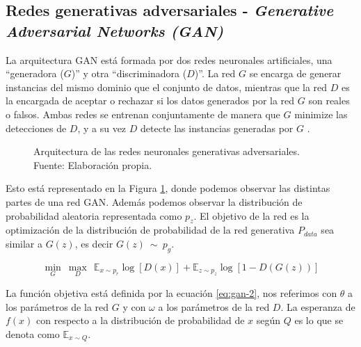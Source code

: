 \subsection{Redes generativas adversariales - \textit{Generative Adversarial Networks (GAN)}}

La arquitectura \gls{GAN} está formada por dos redes neuronales artificiales, una ``generadora ($G$)'' y otra ``discriminadora ($D$)''. La red $G$ se encarga de generar instancias del mismo dominio que el conjunto de datos, mientras que la red $D$ es la encargada de aceptar o rechazar si los datos generados por la red $G$ son reales o falsos. Ambas redes se entrenan conjuntamente de manera que $G$ minimize las detecciones de $D$, y a su vez $D$ detecte las instancias generadas por $G$ \cite{de2023redes}.

\begin{figure}[H]
    \centering
    \centerline{}
    \caption{Arquitectura de las redes neuronales generativas adversariales.\\Fuente: Elaboración propia.}
    \label{fig:gans-architecture}
\end{figure}

Esto está representado en la Figura \ref{fig:gans-architecture}, donde podemos observar las distintas partes de una red \gls{GAN}. Además podemos observar la distribución de probabilidad aleatoria representada como $p_{z}$. El objetivo de la red es la optimización de la distribución de probabilidad de la red generativa $P_{data}$ sea similar a $G(z)$, es decir $G(z)~\sim~p_{g}$.

\begin{equation}
    \min_{G}~\max_{D}~~\mathbb{E}_{x\sim{}p_{r}} \log\left[D(x)\right] + \mathbb{E}_{z \sim{}p_{z}} \log\left[1-D(G(z))\right]
    \label{eq:gan-1}
\end{equation}

La función objetiva está definida por la ecuación \ref{eq:gan-2}, nos referimos con $\theta$ a los parámetros de la red $G$ y con $\omega$ a los parámetros de la red $D$. La esperanza de $f(x)$ con respecto a la distribución de probabilidad de ${x}$ según ${Q}$ es lo que se denota como ${\mathbb{E}_{x \sim Q}}$.

